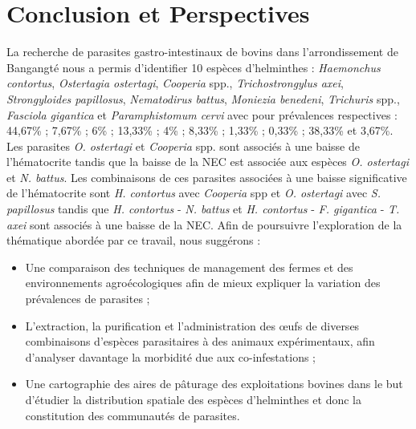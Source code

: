 \chapter*{Conclusion et Perspectives}

La recherche de parasites gastro-intestinaux de bovins dans l’arrondissement de Bangangté nous a permis d’identifier 10 espèces d’helminthes : \textit{Haemonchus contortus}, \textit{Ostertagia ostertagi}, \textit{Cooperia} spp., \textit{Trichostrongylus axei}, \textit{Strongyloides papillosus}, \textit{Nematodirus battus}, \textit{Moniezia benedeni}, \textit{Trichuris} spp., \textit{Fasciola gigantica} et \textit{Paramphistomum cervi} avec pour prévalences respectives : 44,67\% ; 7,67\% ; 6\% ; 13,33\% ; 4\% ; 8,33\% ; 1,33\% ; 0,33\% ; 38,33\% et 3,67\%. Les parasites \textit{O. ostertagi} et \textit{Cooperia} spp. sont associés à une baisse de l’hématocrite tandis que la baisse de la NEC est associée aux espèces \textit{O. ostertagi} et \textit{N. battus}. Les combinaisons de ces parasites associées à une baisse significative de l’hématocrite sont \textit{H. contortus} avec \textit{Cooperia} spp et \textit{O. ostertagi} avec \textit{S. papillosus} tandis que \textit{H. contortus} - \textit{N. battus} et \textit{H. contortus} - \textit{F. gigantica} - \textit{T. axei} sont associés à une baisse de la NEC. Afin de poursuivre l'exploration de la thématique abordée par ce travail, nous suggérons :
\begin{itemize}
\item Une comparaison des techniques de management des fermes et des environnements agroécologiques afin de mieux expliquer la variation des prévalences de parasites ;
\item L’extraction, la purification et l’administration des œufs de diverses combinaisons d’espèces parasitaires à des animaux expérimentaux, afin d’analyser davantage la morbidité due aux co-infestations ;
\item Une cartographie des aires de pâturage des exploitations bovines dans le but d’étudier la distribution spatiale des espèces d’helminthes et donc la constitution des communautés de parasites.
\end{itemize}